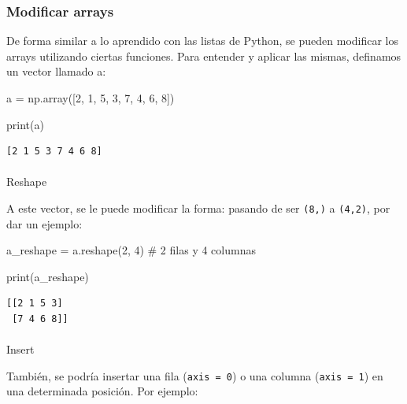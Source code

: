 \documentclass[
  letterpaper,
  DIV=11,
  numbers=noendperiod]{scrreprt}
\makeatletter
\let\oldparagraph\paragraph
\renewcommand{\paragraph}{
    \@ifstar
      \xxxParagraphStar
      \xxxParagraphNoStar
  }
\newcommand{\xxxParagraphStar}[1]{\oldparagraph*{#1}\mbox{}}
\newcommand{\xxxParagraphNoStar}[1]{\oldparagraph{#1}\mbox{}}
\newenvironment{Shaded}{\begin{snugshade}}{\end{snugshade}}
\newcommand{\BuiltInTok}[1]{\textcolor[rgb]{0.00,0.23,0.31}{#1}}
\newcommand{\CommentTok}[1]{\textcolor[rgb]{0.37,0.37,0.37}{#1}}
\newcommand{\DecValTok}[1]{\textcolor[rgb]{0.68,0.00,0.00}{#1}}
\newcommand{\NormalTok}[1]{\textcolor[rgb]{0.00,0.23,0.31}{#1}}
\newcommand{\OperatorTok}[1]{\textcolor[rgb]{0.37,0.37,0.37}{#1}}
\makeatother
\begin{document}
\subsubsection{Modificar arrays}\label{modificar-arrays}

De forma similar a lo aprendido con las listas de Python, se pueden
modificar los arrays utilizando ciertas funciones. Para entender y
aplicar las mismas, definamos un vector llamado a:

\begin{Shaded}
\begin{Highlighting}[]
\NormalTok{a }\OperatorTok{=}\NormalTok{ np.array([}\DecValTok{2}\NormalTok{, }\DecValTok{1}\NormalTok{, }\DecValTok{5}\NormalTok{, }\DecValTok{3}\NormalTok{, }\DecValTok{7}\NormalTok{, }\DecValTok{4}\NormalTok{, }\DecValTok{6}\NormalTok{, }\DecValTok{8}\NormalTok{])}

\BuiltInTok{print}\NormalTok{(a)}
\end{Highlighting}
\end{Shaded}

\begin{verbatim}
[2 1 5 3 7 4 6 8]
\end{verbatim}

\paragraph{Reshape}\label{reshape}

A este vector, se le puede modificar la forma: pasando de ser
\texttt{(8,)} a \texttt{(4,2)}, por dar un ejemplo:

\begin{Shaded}
\begin{Highlighting}[]
\NormalTok{a\_reshape }\OperatorTok{=}\NormalTok{ a.reshape(}\DecValTok{2}\NormalTok{, }\DecValTok{4}\NormalTok{) }\CommentTok{\# 2 filas y 4 columnas}

\BuiltInTok{print}\NormalTok{(a\_reshape)}
\end{Highlighting}
\end{Shaded}

\begin{verbatim}
[[2 1 5 3]
 [7 4 6 8]]
\end{verbatim}

\paragraph{Insert}\label{insert}

También, se podría insertar una fila (\texttt{axis\ =\ 0}) o una columna
(\texttt{axis\ =\ 1}) en una determinada posición. Por ejemplo:
\end{document}
